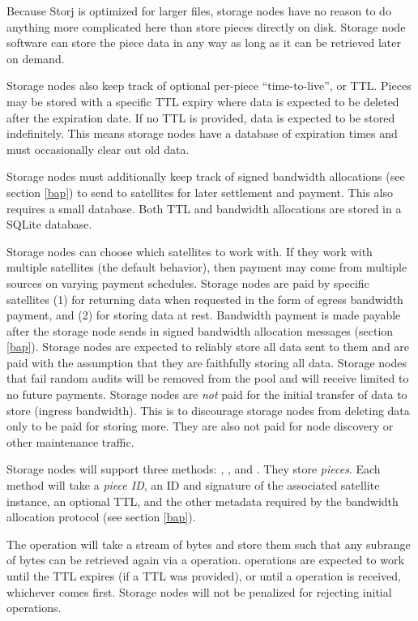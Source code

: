 \documentclass[11pt,fleqn,openany]{book}
\begin{document}
Because Storj is optimized for larger files, storage nodes have no reason to do
anything more complicated here than store pieces directly on disk. Storage
node software can store the piece data in any way as long as it can be
retrieved later on demand.

Storage nodes also keep track of optional per-piece ``time-to-live'', or TTL.
Pieces may be stored with a specific TTL expiry where data is expected to
be deleted after the expiration date. If no TTL is provided, data is expected
to be stored indefinitely. This means storage nodes have a database of
expiration
times and must occasionally clear out old data.

Storage nodes must additionally keep track of signed bandwidth allocations
(see section \ref{bap}) to send to
satellites for later settlement and payment. This also requires a small
database. Both TTL and bandwidth allocations are stored in a SQLite
\cite{sqlite} database.

Storage nodes can choose which satellites to work with. If they work
with multiple satellites (the default behavior), then payment may come from
multiple sources on varying payment schedules.
Storage nodes are paid by specific satellites (1) for returning data when
requested in
the form of egress bandwidth payment, and (2) for storing data at rest.
Bandwidth payment is made payable after
the storage node sends in signed bandwidth allocation messages
(section \ref{bap}).
Storage nodes are expected to reliably store all data sent to them and are
paid
with the assumption that they are faithfully storing all data.
Storage nodes that fail random audits will be removed from the pool and will
receive
limited to no future payments.
Storage nodes are {\em not} paid for the initial transfer of data to store
(ingress
bandwidth). This is to discourage storage nodes from deleting data only to be
paid for
storing more. They are also not paid for node discovery or other
maintenance traffic.

Storage nodes will support three methods: , , and
. They store {\em pieces}.
Each method will take a {\em piece ID}, an ID and signature of the associated
satellite instance, an optional TTL, and the other metadata required by the
bandwidth allocation protocol (see section \ref{bap}).

The  operation will take a stream of bytes and store them such
that any subrange of bytes can be retrieved again via a  operation.
 operations are expected to work until the TTL expires (if a TTL was
provided), or until a  operation is received, whichever comes
first.
Storage
nodes will not be penalized for rejecting initial  operations.
\end{document}
